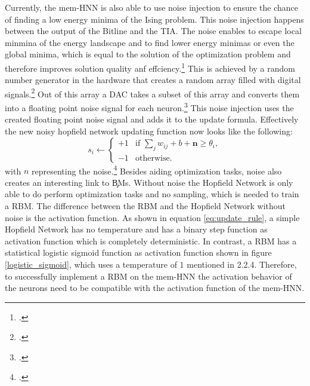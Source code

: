 Currently, the \ac{mem-HNN} is also able to use noise injection to ensure the chance of finding a low energy minima of the Ising problem.
This noise injection happens between the output of the Bitline and the \ac{TIA}. 
The noise enables to escape local minmina of the energy landscape and to find lower energy minimas or even the global minima, which is equal to the solution of the optimization problem and therefore improves solution quality anf effciency.\footcite[cf.][410]{caiPowerefficientCombinatorialOptimization2020} 
This is achieved by a random number generator in the hardware that creates a random array filled with digital signals.\footcite[cf.][22]{caiHarnessingIntrinsicNoise2019}
Out of this array a \ac{DAC} takes a subset of this array and converts them into a floating point noise signal for each neuron.\footcite[cf.][3]{hizzaniMemristorbasedHardwareAlgorithms2023}
This noise injection uses the created floating point noise signal and adds it to the update formula.
Effectively the new noisy hopfield network updating function now looks like the following: 
\begin{equation}
    s_i \leftarrow 
    \begin{cases} 
    +1 & \text{if } \sum_j w_{ij}  + b + \mathbf{n} \geq \theta_i, \\
    -1 & \text{otherwise}.
    \end{cases}
\end{equation}
with \(n\) representing the noise.\footcite[cf.][410]{caiPowerefficientCombinatorialOptimization2020} 
Besides aiding optimization tasks, noise also creates an interesting link to \c{BM}s.
Without noise the Hopfield Network is only able to do perform optimization tasks and no sampling, which is needed to train a \ac{RBM}.
The difference between the \ac{RBM} and the Hopfield Network without noise is the activation function.
As shown in equation \ref{eq:update_rule}, a simple Hopfield Network has no temperature and has a binary step function as activation function which is completely deterministic.
In contrast, a \ac{RBM} has a statistical logistic sigmoid function as activation function shown in figure \ref{logistic_sigmoid}, which uses a temperature of \(1\) mentioned in 2.2.4.
Therefore, to successfully implement a \ac{RBM} on the \ac{mem-HNN} the activation behavior of the neurons need to be compatible with the activation function of the \ac{mem-HNN}.

